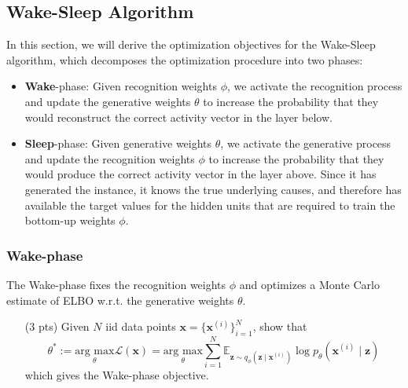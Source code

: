 \subsection{Wake-Sleep Algorithm}\label{section:1-Wake-Sleep}

In this section, we will derive the optimization objectives for the Wake-Sleep algorithm, which decomposes the optimization procedure into two phases:
\begin{itemize}
\item {\bf Wake}-phase: Given recognition weights $\phi$, we activate the recognition process and update the generative weights $\theta$ to increase the probability that they would reconstruct the correct activity vector in the layer below.
\item {\bf Sleep}-phase: Given generative weights $\theta$, we activate the generative process and update the recognition weights $\phi$ to increase the probability that they would produce the correct activity vector in the layer above. Since it has generated the instance, it knows the true underlying causes, and therefore has available the target values for the hidden units that are required to train the bottom-up weights $\phi$.
\end{itemize}

\subsubsection{Wake-phase}

The Wake-phase fixes the recognition weights $\phi$ and optimizes a Monte Carlo estimate of ELBO w.r.t. the generative weights $\theta$.

\begin{itemize}
    \item[(3 pts)] Given $N$ iid data points $\mathbf{x} = \{\mathbf{x}^{(i)}\}_{i=1}^N$, show that
    \begin{equation}
    \theta^* := {\underset{\theta}{\text{arg max}} } \mathcal{L}(\mathbf{x}) {=
    \underset{\theta}{\text{arg max}} } \sum_{i=1}^N \mathbb{E}_{\mathbf{z} \sim q_\phi(\mathbf{z} \mid \mathbf{x}^{(i)})} \log p_\theta(\mathbf{x}^{(i)} \mid \mathbf{z})
    \label{eq:wake-objective}
    \end{equation}
    which gives the Wake-phase objective.

    \begin{solution}
    \end{solution}
\end{itemize}

